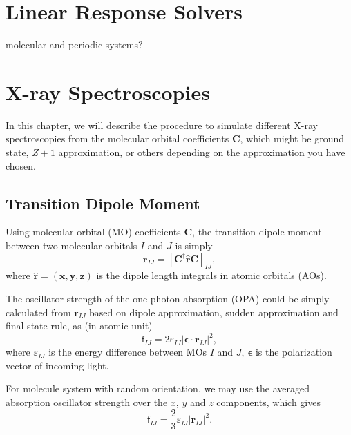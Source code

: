 \documentclass[a4paper,11pt,twoside,openright]{book}
\begin{document}
\chapter{Linear Response Solvers}
\label{chapter-RSP-solvers}

molecular and periodic systems?

\chapter{X-ray Spectroscopies}
\label{chapter-xray}

In this chapter, we will describe the procedure to simulate different X-ray spectroscopies from
the molecular orbital coefficients $\mathbf{C}$, which might be ground state, $Z+1$ approximation,
or others depending on the approximation you have chosen.

\section{Transition Dipole Moment}
\label{section-transition-moment}

Using molecular orbital (MO) coefficients $\mathbf{C}$, the transition dipole moment between two
molecular orbitals $I$ and $J$ is simply
\begin{equation}
  \boldsymbol{r}_{IJ}=\left[\mathbf{C}^{\dagger}\hat{\mathbf{r}}\mathbf{C}\right]_{IJ},
\end{equation}
where $\hat{\mathbf{r}}=\left(\mathbf{x},\mathbf{y},\mathbf{z}\right)$ is the dipole length integrals in
atomic orbitals (AOs).

The oscillator strength of the one-photon absorption (OPA) could be simply calculated from
$\boldsymbol{r}_{IJ}$ based on dipole approximation, sudden approximation and final state rule,
as (in atomic unit)
\begin{equation}
  \mathsf{f}_{IJ}=2\varepsilon_{IJ}|\boldsymbol{\epsilon}\cdot\boldsymbol{r}_{IJ}|^{2},
\end{equation}
where $\varepsilon_{IJ}$ is the energy difference between MOs $I$ and $J$, $\boldsymbol{\epsilon}$
is the polarization vector of incoming light.

For molecule system with random orientation, we may use the averaged absorption
oscillator strength over the $x$, $y$ and $z$ components, which gives
\begin{equation}
  \mathsf{f}_{IJ}=\frac{2}{3}\varepsilon_{IJ}|\boldsymbol{r}_{IJ}|^{2}.
\end{equation}
\end{document}
